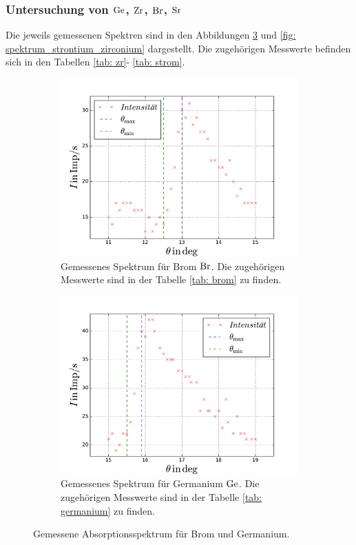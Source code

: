 \subsubsection{Untersuchung von $\ce{Ge}$, $\ce{Zr}$, $\ce{Br}$, $\ce{Sr}$} %
Die jeweils gemessenen Spektren sind in den Abbildungen \ref{fig: spektrum_brom_germanium} und %
\ref{fig: spektrum_strontium_zirconium} dargestellt. Die zugehörigen Messwerte befinden sich in den Tabellen \ref{tab: zr}- \ref{tab: strom}. %
\begin{figure}
  \centering
  \begin{subfigure}{0.48\textwidth}
    \centering
    \includegraphics[width=1 \textwidth]{../Messdaten/brom.pdf}
    \caption{Gemessenes Spektrum für Brom $\ce{Br}$. Die zugehörigen Messwerte sind in der Tabelle \ref{tab: brom} zu finden.} %
    \label{fig: brom_spektrum}
  \end{subfigure}
  \begin{subfigure}{0.48\textwidth}
    \centering
    \includegraphics[width=1 \textwidth]{../Messdaten/germanium.pdf}
    \caption{Gemessenes Spektrum für Germanium $\ce{Ge}$. Die zugehörigen Messwerte sind in der Tabelle \ref{tab: germanium} zu finden.} %
    \label{fig: germaium_spektrum}
  \end{subfigure}
  \caption{Gemessene Absorptionsspektrum für Brom und Germanium.}
  \label{fig: spektrum_brom_germanium}
\end{figure}
